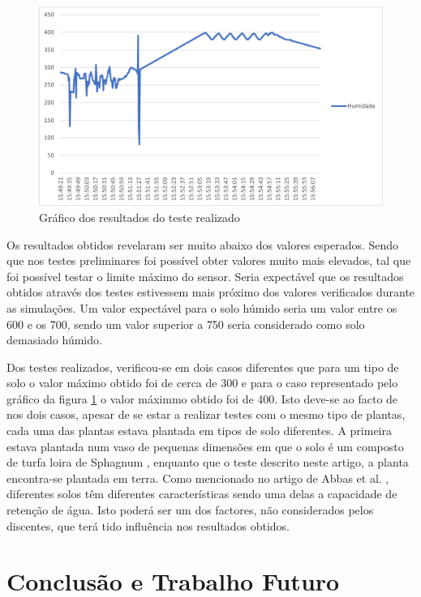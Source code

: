 \documentclass[conference]{IEEEtran}
\begin{document}
\begin{figure}
    \centering
    \includegraphics[scale=0.5]{humidity-test-graph.png}
    \caption{Gráfico dos resultados do teste realizado}
    \label{fig:graphic}
\end{figure}

Os resultados obtidos revelaram ser muito abaixo dos valores esperados. Sendo que nos testes preliminares 
foi possível obter valores muito mais elevados, tal que foi possível testar o limite máximo do sensor. Seria 
expectável que os resultados obtidos através dos testes estivessem mais próximo dos valores verificados 
durante as simulações. Um valor expectável para o solo húmido seria um valor entre os 600 e os 700, sendo 
um valor superior a 750 seria considerado como solo demasiado húmido.

Dos testes realizados, verificou-se em dois casos diferentes que para um tipo de solo o valor máximo obtido foi 
de cerca de 300 e para o caso representado pelo gráfico da figura \ref{fig:graphic} o valor máximmo 
obtido foi de 400.
Isto deve-se ao facto de nos dois casos, apesar de se estar a realizar testes com o mesmo tipo de plantas, 
cada uma das plantas estava plantada em tipos de solo diferentes. A primeira estava plantada num vaso de 
pequenas dimensões em que o solo é um composto de turfa loira de Sphagnum \cite{jardinssintra}, enquanto que 
o teste descrito neste artigo, a planta encontra-se plantada em terra. 
Como mencionado no artigo de Abbas et al. \cite{abbas2014smart}, diferentes solos têm diferentes características 
sendo uma delas a capacidade de retenção de água. Isto poderá ser um dos factores, não considerados pelos 
discentes, que terá tido influência nos resultados obtidos.

\section{Conclusão e Trabalho Futuro}
\end{document}
